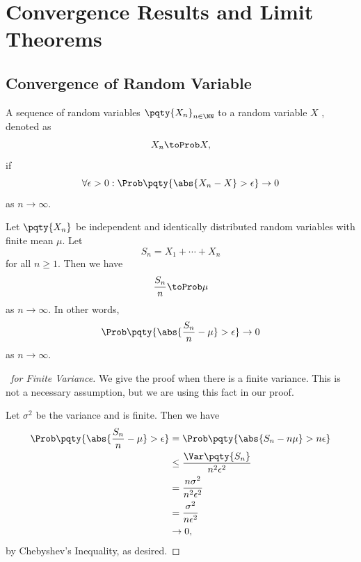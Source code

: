 \section{Convergence Results and Limit Theorems}

\subsection{Convergence of Random Variable}

\begin{definition}
    \label{def:convergence-in-probability}%
    A sequence of random variables \(\pqty{X_n}_{n \in \NN}\)  to a random variable \(X\) , denoted as
    \[
        X_n \toProb X,
    \]
    if
    \[
        \forall \epsilon > 0: \Prob\pqty{\abs{X_n - X} > \epsilon} \to 0
    \]
    as \(n \to \infty\).
\end{definition}

\begin{theorem}
    \label{thm:weak-law-of-large-numbers}%
    Let \(\pqty{X_n}\) be independent and identically distributed random variables with finite mean \(\mu\). Let
    \[
        S_n = X_1 + \cdots + X_n
    \]
    for all \(n \geq 1\). Then we have
    \[
        \frac{S_n}{n} \toProb \mu
    \]
    as \(n \to \infty\). In other words,
    \[
        \Prob\pqty{\abs{\frac{S_n}{n} - \mu} > \epsilon} \to 0
    \]
    as \(n \to \infty\).
\end{theorem}

\begin{proof}[\proofname\ for Finite Variance]
    We give the proof when there is a finite variance. This is not a necessary assumption, but we are using this fact in our proof.

    Let \(\sigma^2\) be the variance and is finite. Then we have
    \begin{align*}
        \Prob\pqty{\abs{\frac{S_n}{n} - \mu} > \epsilon} &= \Prob\pqty{\abs{S_n - n \mu} > n \epsilon} \\
        &\leq \frac{\Var\pqty{S_n}}{n^2 \epsilon^2} \\
        &= \frac{n \sigma^2}{n^2 \epsilon^2} \\
        &= \frac{\sigma^2}{n \epsilon^2} \\
        &\to 0,
    \end{align*}
    by Chebyshev's Inequality, as desired.
\end{proof}

